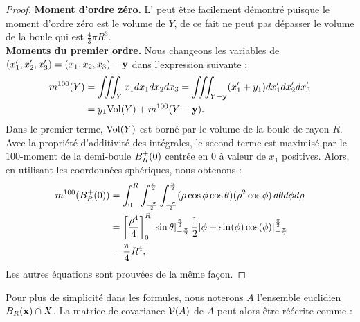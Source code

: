 \begin{proof}
  \textbf{Moment d'ordre zéro.\quad}
  L' peut être facilement démontré puisque le
  moment d'ordre zéro est le volume de $Y$, de ce fait ne peut pas dépasser le
  volume de la boule qui est $\frac{4}{3}\pi R^3$.
  \textbf{\\Moments du premier ordre.\quad}
  Nous changeons les variables de $(x_1',x_2',x_3')=(x_1,x_2,x_3)-\mathbf{y}$ dans
  l'expression suivante :
  \begin{align}
    m^{100}(Y) &= \iiint_Y x_1 dx_1 dx_2 dx_3 = \iiint_{Y-\mathbf{y}} (x_1'+y_1) dx_1'dx_2'dx_3' \\
                 &= y_1 \mathrm{Vol}(Y) + m^{100}(Y-\mathbf{y}).
  \end{align}
  Dans le premier terme, $\mathrm{Vol}(Y)$ est borné par le volume de la boule de rayon
  $R$. Avec la propriété d'additivité des intégrales, le second terme est
  maximisé par le $100$-moment de la demi-boule $B^+_{R}(0)$ centrée en $0$ à
  valeur de $x_1$ positives. Alors, en utilisant les coordonnées sphériques,
  nous obtenons :
  \begin{align}
    m^{100}(B^+_{R}(0))
    &= \int_{0}^{R} \int_{\frac{-\pi}{2}}^{\frac{\pi}{2}} \int_{\frac{-\pi}{2}}^{\frac{\pi}{2}} (\rho\cos\phi\cos\theta)(\rho^2 \cos\phi)  \, d\theta d\phi d\rho \\
    &= \left[\frac{\rho^4}{4} \right]_{0}^{R}  \left [\sin\theta\right ]^\frac{\pi}{2}_{-\frac{\pi}{2}}\frac{1}{2} [\phi + \sin(\phi)\cos(\phi)]^\frac{\pi}{2}_{-\frac{\pi}{2}} \\
    &= \frac{\pi}{4}R^4, \label{eq:exact-half-ball-moment-1}
  \end{align}
  Les autres équations sont prouvées de la même façon.
\end{proof}
%
Pour plus de simplicité dans les formules, nous noterons $A$ l'ensemble
euclidien $B_{R}(\mathbf{x}) \cap X$. La matrice de covariance $\mathcal{V}(A)$ de
$A$ peut alors être réécrite comme :
